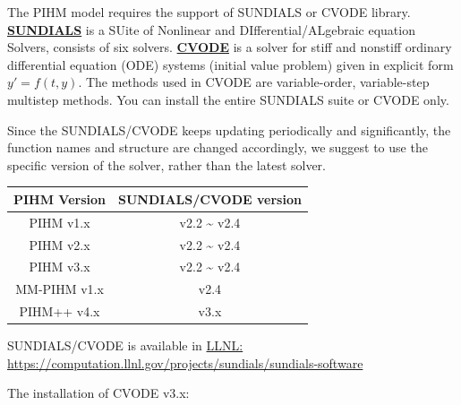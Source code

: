 \documentclass[]{scrbook}
\begin{document}
The PIHM model requires the support of SUNDIALS or CVODE library.
\href{https://computation.llnl.gov/projects/sundials}{\textbf{SUNDIALS}}
is a SUite of Nonlinear and DIfferential/ALgebraic equation Solvers,
consists of six solvers.
\href{https://computation.llnl.gov/projects/sundials/cvode}{\textbf{CVODE}}
is a solver for stiff and nonstiff ordinary differential equation (ODE)
systems (initial value problem) given in explicit form \(y' = f(t,y)\).
The methods used in CVODE are variable-order, variable-step multistep
methods. You can install the entire SUNDIALS suite or CVODE only.

Since the SUNDIALS/CVODE keeps updating periodically and significantly,
the function names and structure are changed accordingly, we suggest to
use the specific version of the solver, rather than the latest solver.

\begin{longtable}[]{@{}cc@{}}
\toprule
PIHM Version & SUNDIALS/CVODE version\tabularnewline
\midrule
\endhead
PIHM v1.x & v2.2 \textasciitilde{} v2.4\tabularnewline
PIHM v2.x & v2.2 \textasciitilde{} v2.4\tabularnewline
PIHM v3.x & v2.2 \textasciitilde{} v2.4\tabularnewline
MM-PIHM v1.x & v2.4\tabularnewline
PIHM++ v4.x & v3.x\tabularnewline
\bottomrule
\end{longtable}

SUNDIALS/CVODE is available in
\href{https://computation.llnl.gov/projects/sundials/sundials-software}{LLNL:
https://computation.llnl.gov/projects/sundials/sundials-software}

The installation of CVODE v3.x:
\end{document}
